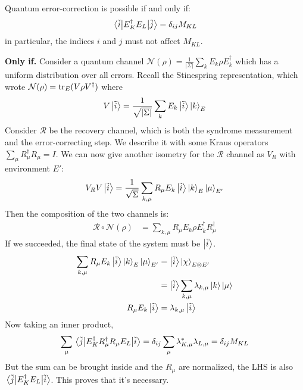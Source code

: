 \begin{theorem}
    Quantum error-correction is possible if and only if:
    \[ \mel{\tilde{i}}{E_K^{\dagger} E_L}{\tilde{j}} = \delta_{ij} M_{KL} \]
    in particular, the indices $i$ and $j$ must not affect $M_{KL}$.

    \begin{proof*}
        \textbf{Only if.}
        Consider a quantum channel $\mathcal{N}(\rho) = \frac{1}{|\Sigma|} \sum_k E_k \rho E_k^{\dagger}$
        which has a uniform distribution over all errors. Recall the Stinespring representation,
        which wrote $\mathcal{N}(\rho) = \tr_E(V \rho V^{\dagger})$ where
        \[ V \ket{\tilde{i}} = \frac{1}{\sqrt{|\Sigma|}} \sum_k E_k \ket{\tilde{i}} \ket{k}_E \]
        Consider $\mathcal{R}$ be the recovery channel, which is both the syndrome measurement and the
        error-correcting step. We describe it with some Kraus operators $\sum_\mu R_{\mu}^{\dagger} R_{\mu} = I$.
        We can now give another isometry for the $\mathcal{R}$ channel as $V_R$ with environment $E'$:
        \[ V_R V \ket{\tilde{i}} = \frac{1}{\sqrt{\Sigma}} \sum_{k, \mu} R_\mu E_k \ket{\tilde{i}} \ket{k}_E \ket{\mu}_{E'}\]
        Then the composition of the two channels is:
        \begin{align*}
            \mathcal{R} \circ \mathcal{N}(\rho) &= \sum_{k, \mu} R_{\mu} E_k \rho E_k^{\dagger} R_{\mu}^{\dagger}
        \end{align*}
        If we succeeded, the final state of the system must be $\ket{\tilde{i}}$.
        \begin{align*}
            \sum_{k, \mu} R_\mu E_k \ket{\tilde{i}} \ket{k}_E \ket{\mu}_{E'} &= \ket{\tilde{i}} \ket{\chi}_{E \otimes E'} \\
            &= \ket{\tilde{i}} \sum_{k, \mu} \lambda_{k, \mu} \ket{k} \ket{\mu} \\
            R_{\mu} E_k \ket{\tilde{i}} &= \lambda_{k, \mu} \ket{\tilde{i}} 
        \end{align*}
        Now taking an inner product,
        \[ \sum_{\mu} \mel{\tilde{j}}{E_K^{\dagger} R_{\mu}^{\dagger} R_{\mu} E_L}{\tilde{i}} = \delta_{ij} \sum_{\mu} \lambda_{K, \mu}^* \lambda_{L,\mu}  = \delta_{ij} M_{KL}\]
        But the sum can be brought inside and the $R_{\mu}$ are normalized, the LHS is also $\mel{\tilde{j}}{E_K^{\dagger} E_L}{\tilde{i}}$.
        This proves that it's necessary.
        

\end{proof*}
\end{theorem}
